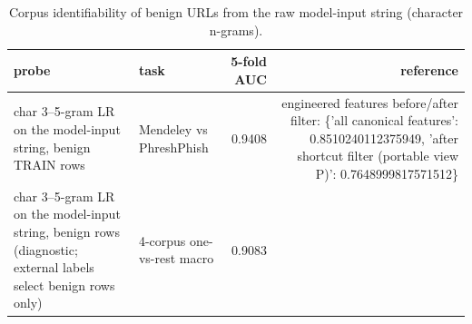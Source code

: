\begin{table}[t]
\centering
\scriptsize
\caption{Corpus identifiability of benign URLs from the raw model-input string (character n-grams).}
\label{tab:rev_R8_string_level_identifiability}
\begin{tabular}{llrr}
\toprule
probe & task & 5-fold AUC & reference \\
\midrule
char 3–5-gram LR on the model-input string, benign TRAIN rows & Mendeley vs PhreshPhish & 0.9408 & engineered features before/after filter: \{'all canonical features': 0.8510240112375949, 'after shortcut filter (portable view P)': 0.7648999817571512\} \\
char 3–5-gram LR on the model-input string, benign rows (diagnostic; external labels select benign rows only) & 4-corpus one-vs-rest macro & 0.9083 &  \\
\bottomrule
\end{tabular}
\end{table}